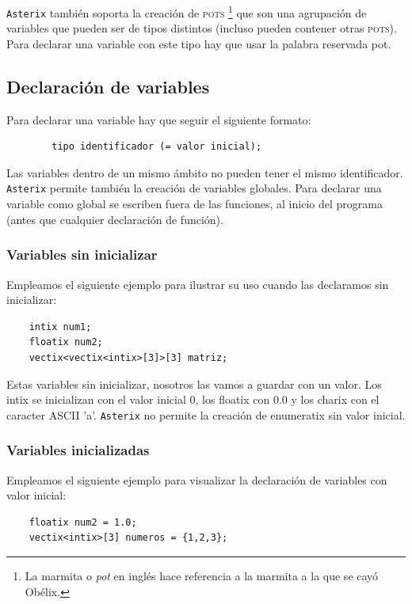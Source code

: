 \documentclass[a4paper, 9pt]{article}
\newcommand{\atx}{\texttt{Asterix} }
\begin{document}
    \atx también soporta la creación de \textsc{pots} \footnote{La marmita o
    \textit{pot} en inglés hace referencia a la marmita a la que se cayó
    Obélix.} que son una agrupación de variables que pueden ser de tipos
    distintos (incluso pueden contener otras \textsc{pots}). Para declarar una
    variable con este tipo hay que usar la palabra reservada \textsf{pot}.

    \subsection*{Declaración de variables}
    Para declarar una variable hay que seguir el siguiente formato: 
    \begin{verbatim}
        tipo identificador (= valor inicial);
    \end{verbatim}
    
    Las variables dentro de un mismo ámbito no pueden tener el mismo identificador. 
    \atx permite también la creación de variables globales. Para declarar una variable como 
    global se escriben fuera de las funciones, al inicio del programa (antes 
    que cualquier declaración de función). 

    \subsubsection*{Variables sin inicializar}
    Empleamos el siguiente ejemplo para ilustrar su uso cuando
    las declaramos sin inicializar:

    \begin{verbatim}
    intix num1;
    floatix num2;
    vectix<vectix<intix>[3]>[3] matriz;
    \end{verbatim}

    Estas variables sin inicializar, nosotros las vamos a guardar con un valor.
    Los intix se inicializan con el valor inicial 0, los floatix con 0.0 y los
    charix con el caracter ASCII 'a'. \atx no permite la creación de enumeratix
    sin valor inicial.
    
    \subsubsection*{Variables inicializadas}
    Empleamos el siguiente ejemplo para visualizar la declaración de variables
    con valor inicial:

    \begin{verbatim}
    floatix num2 = 1.0;
    vectix<intix>[3] numeros = {1,2,3};
    \end{verbatim}
\end{document}
